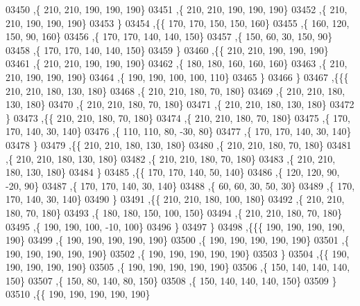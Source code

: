 \begin{DoxyCode}
03450     ,\{   210,   210,   190,   190,   190\}
03451     ,\{   210,   210,   190,   190,   190\}
03452     ,\{   210,   210,   190,   190,   190\}
03453     \}
03454    ,\{\{   170,   170,   150,   150,   160\}
03455     ,\{   160,   120,   150,    90,   160\}
03456     ,\{   170,   170,   140,   140,   150\}
03457     ,\{   150,    60,    30,   150,    90\}
03458     ,\{   170,   170,   140,   140,   150\}
03459     \}
03460    ,\{\{   210,   210,   190,   190,   190\}
03461     ,\{   210,   210,   190,   190,   190\}
03462     ,\{   180,   180,   160,   160,   160\}
03463     ,\{   210,   210,   190,   190,   190\}
03464     ,\{   190,   190,   100,   100,   110\}
03465     \}
03466    \}
03467   ,\{\{\{   210,   210,   180,   130,   180\}
03468     ,\{   210,   210,   180,    70,   180\}
03469     ,\{   210,   210,   180,   130,   180\}
03470     ,\{   210,   210,   180,    70,   180\}
03471     ,\{   210,   210,   180,   130,   180\}
03472     \}
03473    ,\{\{   210,   210,   180,    70,   180\}
03474     ,\{   210,   210,   180,    70,   180\}
03475     ,\{   170,   170,   140,    30,   140\}
03476     ,\{   110,   110,    80,   -30,    80\}
03477     ,\{   170,   170,   140,    30,   140\}
03478     \}
03479    ,\{\{   210,   210,   180,   130,   180\}
03480     ,\{   210,   210,   180,    70,   180\}
03481     ,\{   210,   210,   180,   130,   180\}
03482     ,\{   210,   210,   180,    70,   180\}
03483     ,\{   210,   210,   180,   130,   180\}
03484     \}
03485    ,\{\{   170,   170,   140,    50,   140\}
03486     ,\{   120,   120,    90,   -20,    90\}
03487     ,\{   170,   170,   140,    30,   140\}
03488     ,\{    60,    60,    30,    50,    30\}
03489     ,\{   170,   170,   140,    30,   140\}
03490     \}
03491    ,\{\{   210,   210,   180,   100,   180\}
03492     ,\{   210,   210,   180,    70,   180\}
03493     ,\{   180,   180,   150,   100,   150\}
03494     ,\{   210,   210,   180,    70,   180\}
03495     ,\{   190,   190,   100,   -10,   100\}
03496     \}
03497    \}
03498   ,\{\{\{   190,   190,   190,   190,   190\}
03499     ,\{   190,   190,   190,   190,   190\}
03500     ,\{   190,   190,   190,   190,   190\}
03501     ,\{   190,   190,   190,   190,   190\}
03502     ,\{   190,   190,   190,   190,   190\}
03503     \}
03504    ,\{\{   190,   190,   190,   190,   190\}
03505     ,\{   190,   190,   190,   190,   190\}
03506     ,\{   150,   140,   140,   140,   150\}
03507     ,\{   150,    80,   140,    80,   150\}
03508     ,\{   150,   140,   140,   140,   150\}
03509     \}
03510    ,\{\{   190,   190,   190,   190,   190\}

\end{DoxyCode}
